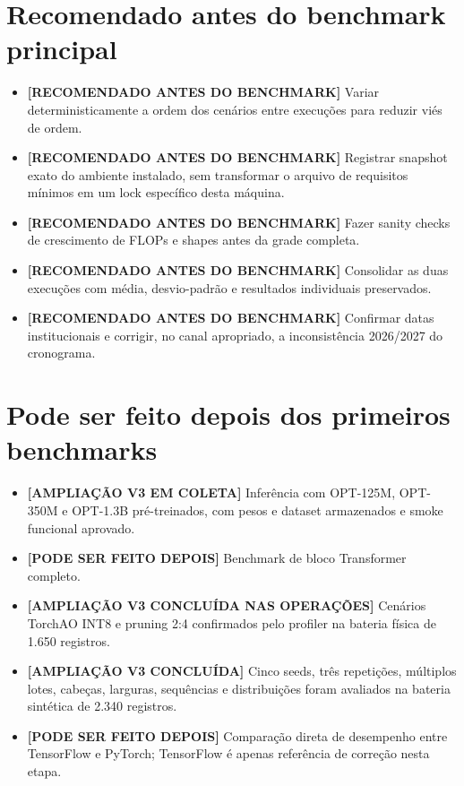 \section{Recomendado antes do benchmark principal}


\begin{itemize}
\item \textbf{[RECOMENDADO ANTES DO BENCHMARK]} Variar deterministicamente a ordem
dos cenários entre execuções para reduzir viés de ordem.
\item \textbf{[RECOMENDADO ANTES DO BENCHMARK]} Registrar snapshot exato do ambiente
instalado, sem transformar o arquivo de requisitos mínimos em um lock
específico desta máquina.
\item \textbf{[RECOMENDADO ANTES DO BENCHMARK]} Fazer sanity checks de crescimento de
FLOPs e shapes antes da grade completa.
\item \textbf{[RECOMENDADO ANTES DO BENCHMARK]} Consolidar as duas execuções com
média, desvio-padrão e resultados individuais preservados.
\item \textbf{[RECOMENDADO ANTES DO BENCHMARK]} Confirmar datas institucionais e
corrigir, no canal apropriado, a inconsistência 2026/2027 do cronograma.
\end{itemize}


\section{Pode ser feito depois dos primeiros benchmarks}


\begin{itemize}
\item \textbf{[AMPLIAÇÃO V3 EM COLETA]} Inferência com OPT-125M, OPT-350M e
OPT-1.3B pré-treinados, com pesos e dataset armazenados e smoke funcional aprovado.
\item \textbf{[PODE SER FEITO DEPOIS]} Benchmark de bloco Transformer completo.
\item \textbf{[AMPLIAÇÃO V3 CONCLUÍDA NAS OPERAÇÕES]} Cenários TorchAO INT8 e
pruning 2:4 confirmados pelo profiler na bateria física de 1.650 registros.
\item \textbf{[AMPLIAÇÃO V3 CONCLUÍDA]} Cinco seeds, três repetições, múltiplos
lotes, cabeças, larguras, sequências e distribuições foram avaliados na bateria
sintética de 2.340 registros.
\item \textbf{[PODE SER FEITO DEPOIS]} Comparação direta de desempenho entre
TensorFlow e PyTorch; TensorFlow é apenas referência de correção nesta etapa.
\end{itemize}


